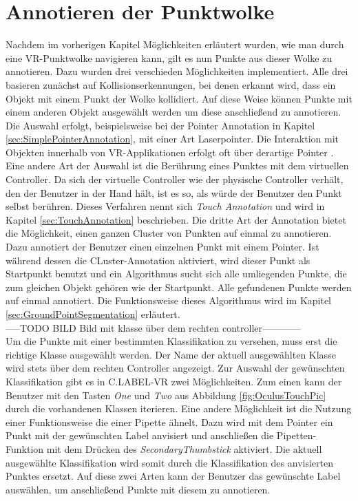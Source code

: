 \section{Annotieren der Punktwolke}
\label{sec:Annotation}
Nachdem im vorherigen Kapitel Möglichkeiten erläutert wurden, wie man durch eine VR-Punktwolke navigieren kann, gilt es nun Punkte aus dieser Wolke zu annotieren. Dazu wurden drei verschieden Möglichkeiten implementiert. Alle drei basieren zunächst auf Kollisionserkennungen, bei denen erkannt wird, dass ein Objekt mit einem Punkt der Wolke kollidiert. Auf diese Weise können Punkte mit einem anderen Objekt ausgewählt werden um diese anschließend zu annotieren. Die Auswahl erfolgt, beispielsweise bei der Pointer Annotation in Kapitel \ref{sec:SimplePointerAnnotation}, mit einer Art Laserpointer. Die Interaktion mit Objekten innerhalb von VR-Applikationen erfolgt oft über derartige Pointer \cite{bib:OftenPointerUse}. Eine andere Art der Auswahl ist die Berührung eines Punktes mit dem virtuellen Controller. Da sich der virtuelle Controller wie der physische Controller verhält, den der Benutzer in der Hand hält, ist es so, als würde der Benutzer den Punkt selbst berühren. Dieses Verfahren nennt sich \textit{Touch Annotation} und wird in Kapitel \ref{sec:TouchAnnotation} beschrieben. Die dritte Art der Annotation bietet die Möglichkeit, einen ganzen Cluster von Punkten auf einmal zu annotieren. Dazu annotiert der Benutzer einen einzelnen Punkt mit einem Pointer. Ist während dessen die CLuster-Annotation aktiviert, wird dieser Punkt als Startpunkt benutzt und ein Algorithmus sucht sich alle umliegenden Punkte, die zum gleichen Objekt gehören wie der Startpunkt. Alle gefundenen Punkte werden auf einmal annotiert. Die Funktionsweise dieses Algorithmus wird im Kapitel \ref{sec:GroundPointSegmentation} erläutert.\\

-----TODO BILD Bild mit klasse über dem rechten controller------------\\


Um die Punkte mit einer bestimmten Klassifikation zu versehen, muss erst die richtige Klasse ausgewählt werden. Der Name der aktuell ausgewählten Klasse wird stets über dem rechten Controller angezeigt. Zur Auswahl der gewünschten Klassifikation gibt es in C.LABEL-VR zwei Möglichkeiten. Zum einen kann der Benutzer mit den Tasten \textit{One} und \textit{Two} aus Abbildung \ref{fig:OculusTouchPic} durch die vorhandenen Klassen iterieren. Eine andere Möglichkeit ist die Nutzung einer Funktionsweise die einer Pipette ähnelt. Dazu wird mit dem Pointer ein Punkt mit der gewünschten Label anvisiert und anschließen die Pipetten-Funktion mit dem Drücken des \textit{SecondaryThumbstick} aktiviert. Die aktuell ausgewählte Klassifikation wird somit durch die Klassifikation des anvisierten Punktes ersetzt. Auf diese zwei Arten kann der Benutzer das gewünschte Label auswählen, um anschließend Punkte mit diesem zu annotieren.

